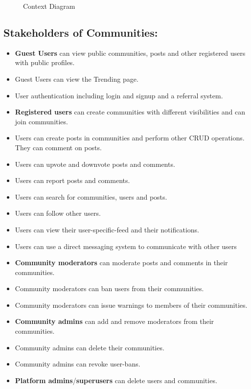 \documentclass[11pt]{article}
\begin{document}
\begin{figure}[H]
    \centering
    \caption{Context Diagram}
    \label{fig:context_diagram}
\end{figure}

\begin{itemize}
\subsection{Stakeholders of Communities:}
\begin{itemize}
    \item \textbf{Guest Users} can view public communities, posts and other registered users with public profiles.
    \item Guest Users can view the Trending page.
    \item User authentication including login and signup and a referral system.
    \item \textbf{Registered users} can create communities with different visibilities and can join communities.
    \item Users can create posts in communities and perform other CRUD operations. They can comment on posts.
    \item Users can upvote and downvote posts and comments.
    \item Users can report posts and comments.
    \item Users can search for communities, users and posts.
    \item Users can follow other users.
    \item Users can view their user-specific-feed and their notifications.
    \item Users can use a direct messaging system to communicate with other users
    \item \textbf{Community moderators} can moderate posts and comments in their communities.
    \item Community moderators can ban users from their communities.
    \item Community moderators can issue warnings to members of their communities.
    \item \textbf{Community admins} can add and remove moderators from their communities.
    \item Community admins can delete their communities.
    \item Community admins can revoke user-bans.
    \item \textbf{Platform admins}/\textbf{superusers} can delete users and communities.
\end{itemize}

\end{itemize}
\end{document}
